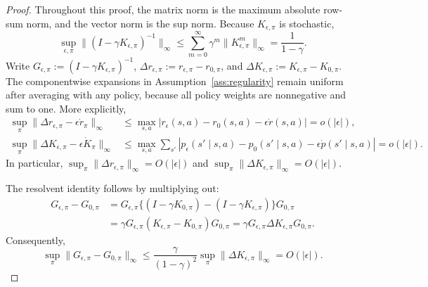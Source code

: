 \documentclass[10pt,a4paper]{amsart}
\begin{document}
\begin{proof}
    Throughout this proof, the matrix norm is the maximum absolute
    row-sum norm, and the vector norm is the sup norm.  Because
    $K_{\epsilon,\pi}$ is stochastic,
    \[
        \sup_{\epsilon,\pi}
        \|(I-\gamma K_{\epsilon,\pi})^{-1}\|_\infty
        \leq
        \sum_{m=0}^{\infty}\gamma^m
        \|K_{\epsilon,\pi}^m\|_\infty
        =\frac1{1-\gamma}.
    \]
    Write
    $G_{\epsilon,\pi}:=(I-\gamma K_{\epsilon,\pi})^{-1}$,
    $\Delta r_{\epsilon,\pi}:=
      r_{\epsilon,\pi}-r_{0,\pi}$, and
    $\Delta K_{\epsilon,\pi}:=
      K_{\epsilon,\pi}-K_{0,\pi}$.
    The componentwise expansions in
    Assumption~\ref{ass:regularity} remain uniform after averaging
    with any policy, because all policy weights are nonnegative and
    sum to one.  More explicitly,
    \[
        \begin{aligned}
        \sup_{\pi}\|
        \Delta r_{\epsilon,\pi}-\epsilon\dot r_\pi
        \|_\infty
        &\leq
        \max_{s,a}|r_\epsilon(s,a)-r_0(s,a)
        -\epsilon\dot r(s,a)|
        =o(|\epsilon|),\\
        \sup_{\pi}\|
        \Delta K_{\epsilon,\pi}-\epsilon\dot K_\pi
        \|_\infty
        &\leq
        \max_{s,a}\sum_{s'}
        |p_\epsilon(s'\mid s,a)-p_0(s'\mid s,a)
        -\epsilon\dot p(s'\mid s,a)|
        =o(|\epsilon|).
        \end{aligned}
    \]
    In particular,
    $\sup_\pi\|\Delta r_{\epsilon,\pi}\|_\infty=O(|\epsilon|)$
    and
    $\sup_\pi\|\Delta K_{\epsilon,\pi}\|_\infty=O(|\epsilon|)$.

    The resolvent identity follows by multiplying out:
    \[
        \begin{aligned}
        G_{\epsilon,\pi}-G_{0,\pi}
        &=
        G_{\epsilon,\pi}
        \{(I-\gamma K_{0,\pi})
          -(I-\gamma K_{\epsilon,\pi})\}
        G_{0,\pi}\\
        &=
        \gamma G_{\epsilon,\pi}
        (K_{\epsilon,\pi}-K_{0,\pi})G_{0,\pi}
        =
        \gamma G_{\epsilon,\pi}
        \Delta K_{\epsilon,\pi}G_{0,\pi}.
        \end{aligned}
    \]
    Consequently,
    \[
        \sup_\pi\|G_{\epsilon,\pi}-G_{0,\pi}\|_\infty
        \leq
        \frac{\gamma}{(1-\gamma)^2}
        \sup_\pi\|\Delta K_{\epsilon,\pi}\|_\infty
        =O(|\epsilon|).
    \]


\end{proof}
\end{document}
